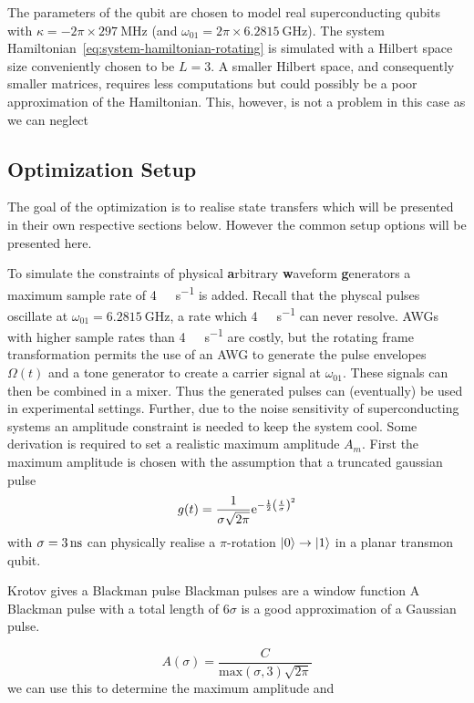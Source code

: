 \documentclass[main.tex]{subfiles}
\begin{document}
The parameters of the qubit are chosen to model real superconducting qubits with \( \kappa = -2\pi\times\SI{297}{\mega\hertz} \) (and \( \omega_{01} = 2\pi\times\SI{6.2815}{\giga\hertz} \)).
The system Hamiltonian~\eqref{eq:system-hamiltonian-rotating} is simulated with a Hilbert space size conveniently chosen to be \( L = 3 \).
A smaller Hilbert space, and consequently smaller matrices, requires less computations but could possibly be a poor approximation of the Hamiltonian.
This, however, is not a problem in this case as we can neglect %

\subsection{Optimization Setup}
The goal of the optimization is to realise state transfers which will be presented in their own respective sections below.
However the common setup options will be presented here.

To simulate the constraints of physical \textbf{a}rbitrary \textbf{w}aveform \textbf{g}enerators a maximum sample rate of \SI{4}{\giga\samples\per\second} is added.
Recall that the physcal pulses oscillate at \( \omega_{01} = \SI{6.2815}{\giga\hertz} \), a rate which \SI{4}{\giga\samples\per\second} can never resolve.
AWGs with higher sample rates than \SI{4}{\giga\samples\per\second} are costly, but the rotating frame transformation permits the use of an AWG to generate the pulse envelopes \( \Omega(t) \) and a tone generator to create a carrier signal at \( \omega_{01} \).
These signals can then be combined in a mixer.
Thus the generated pulses can (eventually) be used in experimental settings.
Further, due to the noise sensitivity of superconducting systems an amplitude constraint is needed to keep the system cool.
Some derivation is required to set a realistic maximum amplitude \( A_m \).
First the maximum amplitude is chosen with the assumption that a truncated gaussian pulse
\begin{equation}
    g(t) = \frac{1}{\sigma\sqrt{2\pi}} \mathrm{e}^{-\frac{1}{2}\qty(\frac{t}{\sigma})^2}
\end{equation}
with \( \sigma = \SI{3}{\nano\second} \) can physically realise a \(\pi\)-rotation \( \ket{0} \rightarrow \ket{1} \) in a planar transmon qubit.

Krotov gives a Blackman pulse
Blackman pulses are a window function 
A Blackman pulse with a total length of \(6\sigma\) is a good approximation of a Gaussian pulse.

\begin{equation}
    A(\sigma) = \frac{C}{\text{max}(\sigma,3)\sqrt{2\pi}}
\end{equation}
we can use this to determine the maximum amplitude and 
\end{document}
